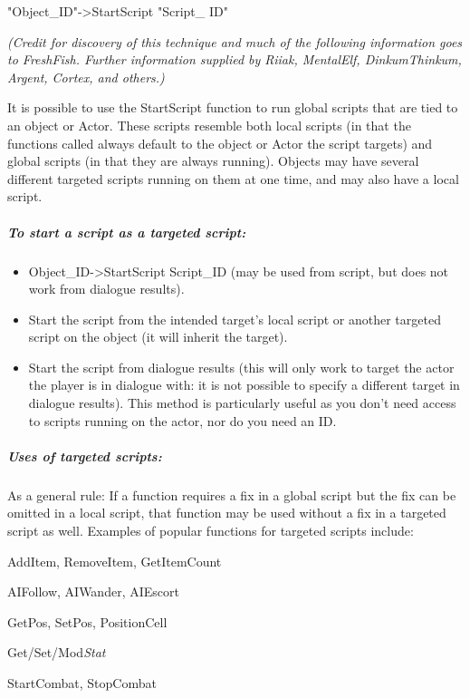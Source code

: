 \documentclass[
]{article}
\begin{document}
"Object\_ID"-\textgreater StartScript "Script\_ ID"

\emph{(Credit for discovery of this technique and much of the following
information goes to FreshFish. Further information supplied by Riiak,
MentalElf, DinkumThinkum, Argent, Cortex, and others.)}

It is possible to use the StartScript function to run global scripts
that are tied to an object or Actor. These scripts resemble both local
scripts (in that the functions called always default to the object or
Actor the script targets) and global scripts (in that they are always
running). Objects may have several different targeted scripts running on
them at one time, and may also have a local script.

\hypertarget{to-start-a-script-as-a-targeted-script}{%
\subparagraph{To start a script as a targeted
script:}\label{to-start-a-script-as-a-targeted-script}}

\begin{itemize}
\item
  Object\_ID-\textgreater StartScript Script\_ID (may be used from
  script, but does not work from dialogue results).
\item
  Start the script from the intended target's local script or another
  targeted script on the object (it will inherit the target).
\item
  Start the script from dialogue results (this will only work to target
  the actor the player is in dialogue with: it is not possible to
  specify a different target in dialogue results). This method is
  particularly useful as you don't need access to scripts running on the
  actor, nor do you need an ID.
\end{itemize}

\hypertarget{uses-of-targeted-scripts}{%
\subparagraph{Uses of targeted
scripts:}\label{uses-of-targeted-scripts}}

As a general rule: If a function requires a fix in a global script but
the fix can be omitted in a local script, that function may be used
without a fix in a targeted script as well. Examples of popular
functions for targeted scripts include:

AddItem, RemoveItem, GetItemCount

AIFollow, AIWander, AIEscort

GetPos, SetPos, PositionCell

Get/Set/Mod\emph{Stat}

StartCombat, StopCombat
\end{document}
